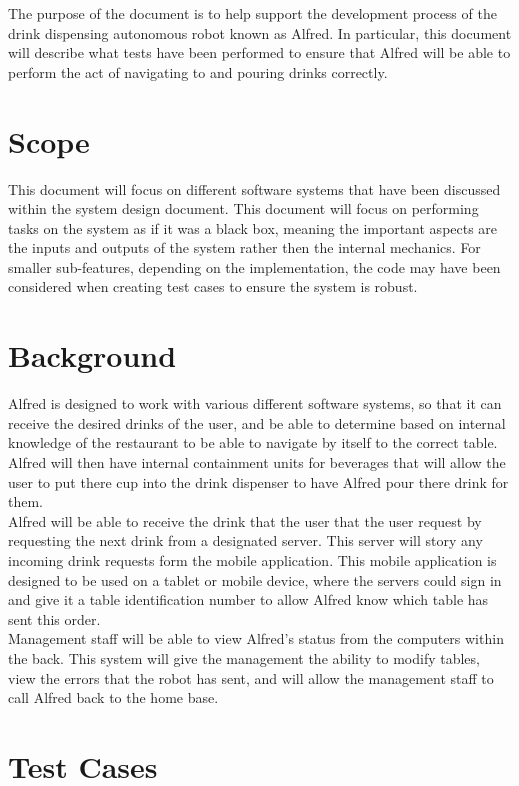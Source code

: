 \documentclass [10pt]{article}
\begin{document}
The purpose of the document is to help support the development process of the drink dispensing autonomous robot known as Alfred. In particular, this document will describe what tests have been performed to ensure that Alfred will be able to perform the act of navigating to and pouring drinks correctly. 

\section {Scope}
This document will focus on different software systems that have been discussed within the system design document. This document will focus on performing tasks on the system as if it was a black box, meaning the important aspects are the inputs and outputs of the system rather then the internal mechanics. For smaller sub-features, depending on the implementation, the code may have been considered when creating test cases to ensure the system is robust. 

\section{Background}

Alfred is designed to work with various different software systems, so that it can receive the desired drinks of the user, and be able to determine based on internal knowledge of the restaurant to be able to navigate by itself to the correct table. Alfred will then have internal containment units for beverages that will allow the user to put there cup into the drink dispenser to have Alfred pour there drink for them.\\

 Alfred will be able to receive the drink that the user that the user request by requesting the next drink from a designated server. This server will story any incoming drink requests form the mobile application. This mobile application is designed to be used on a tablet or mobile device, where the servers could sign in and give it a table identification number to allow Alfred know which table has sent this order.\\
 
 Management staff will be able to view Alfred's status from the computers within the back. This system will give the management the ability to modify tables, view the errors that the robot has sent, and will allow the management staff to call Alfred back to the home base.

\section {Test Cases}
\end{document}
